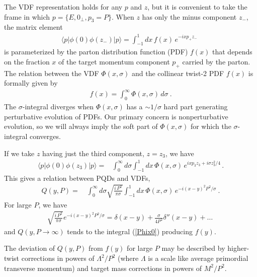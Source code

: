 \documentclass[final,5p,times,twocolumn]{elsarticle}
\begin{document}
The  VDF representation holds for any  $p$ and $z$, 
but it is convenient to take the frame  in which $p =\{ E, 0_\perp, p_3=P \}$. 
When $z$ has only  the minus component $z_-$,  the matrix element 
 \begin{align}
  \langle  p |\phi (0) \phi(z_-)  
| p \rangle =
   \int_{-1}^1 dx \, f(x) \, 
e^{-ixp_+ z_-} \,  \  
 \label{twist2par0}
\end{align}
is parameterized by the parton distribution function (PDF) $f(x)$ 
that depends on the fraction $x$ of the target momentum 
component $p_+$ 
carried by the parton. 
The   relation between the VDF $\Phi  (x, \sigma) $ and the collinear  twist-2  PDF $f(x)$
is formally given by 
\begin{align} 
  f  (x) = 
\int_{0}^{\infty}  \Phi (x,\sigma) \, d \sigma   \ .
\label{Phix0}
\end{align} 
The $\sigma$-integral diverges when $\Phi (x,\sigma)$ has a $\sim 1/\sigma$
hard part generating perturbative evolution of  PDFs.
Our primary concern is nonperturbative evolution,
so we will always imply  the soft part of $\Phi (x,\sigma)$
for which the $\sigma$-integral converges. 


If we take $z$ having just the third component,  $z=z_3$, we have 
 \begin{align}
  \langle p |   \phi(0) \phi (z_3)|p \rangle %
=  & 
\int_{0}^{\infty} d \sigma \int_{-1}^1 dx\,  %
 \Phi (x,\sigma) \, 
 e^{i x p_3 z_3 +i \sigma z_3^2/{4}} \,  .
 \label{newVDFxz3}
\end{align} 
This gives  a relation between PQDs and VDFs,
 \begin{align}
 Q(y, P)  = & \,\int_{0}^{\infty} d   \sigma \sqrt{\frac{i \, P^2}{\pi \sigma}}
 \int_{-1}^1 dx\,  %
 \Phi (x,\sigma) \, %
  e^{- i (x -y)^2 P^2 / \sigma }
 \ . 
 \label{PQDPhi}
\end{align} 
For large $P$,
we have 
 \begin{align}
  \sqrt{\frac{i\, P^2}{\pi \sigma}}
  e^{- i (x -y)^2 P^2 / \sigma } =  \delta (x-y) + \frac{\sigma}{4 P^2} \delta'' (x-y) + \ldots
 \
 \label{Qin3}
\end{align} 
and $Q(y, P\to \infty)$ tends to the integral  (\ref{Phix0})  producing $f(y)$. 

The deviation of $Q(y, P)$  from $f(y)$ for large  $P$ 
may be described by higher-twist corrections in powers 
of $\Lambda^2/P^2$ (where $\Lambda$ is a scale like average 
primordial transverse momentum) and target mass corrections
in powers of $M^2/P^2$. 
\end{document}
